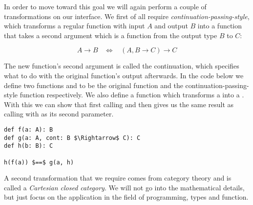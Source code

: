 In order to move toward this goal we will again perform a couple of transformations on our \comp interface. We first of all require \textit{continuation-passing-style}, which transforms a regular function with input $A$ and output $B$ into a function that takes a second argument which is a function from the output type $B$ to $C$:

\[A \rightarrow B \ \ \ \ \Leftrightarrow \ \ \ \ (A, B \rightarrow C) \rightarrow C\]

The new function's second argument is called the continuation, which specifies what to do with the original function's output afterwards. In the code below we define two functions  and  to be the original function and the continuation-passing-style function respectively. We also define a function  which transforms a  into a . With this we can show that first calling  and then  gives us the same result as calling  with  as its second parameter.

\begin{lstlisting}[style=InlineScalaStyle]
def f(a: A): B
def g(a: A, cont: B $\Rightarrow$ C): C
def h(b: B): C

h(f(a)) $==$ g(a, h)
\end{lstlisting}

A second transformation that we require comes from category theory and is called a \textit{Cartesian closed category}. We will not go into the mathematical details, but just focus on the application in the field of programming, types and function. 


























































